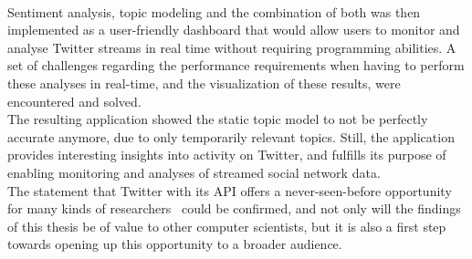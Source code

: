 \\
Sentiment analysis, topic modeling and the combination of both was then implemented as a user-friendly dashboard that would
allow users to monitor and analyse Twitter streams in real time without requiring programming abilities.
A set of challenges regarding the performance requirements when having to perform these analyses in real-time,
and the visualization of these results, were encountered and solved.
\\
The resulting application showed the static topic model to not be perfectly accurate anymore,
due to only temporarily relevant topics.
Still, the application provides interesting insights into activity on Twitter,
and fulfills its purpose of enabling monitoring and analyses of streamed social network data.
\\
The statement that Twitter with its API offers a never-seen-before opportunity for
many kinds of researchers~\cite{Kwak2010} could be confirmed,
and not only will the findings of this thesis be of value to other computer scientists,
but it is also a first step towards opening up this opportunity to a broader audience.
